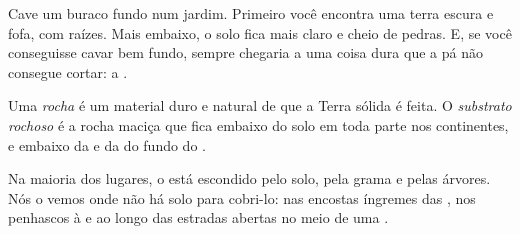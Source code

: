 Cave um buraco fundo num jardim. Primeiro você encontra uma terra escura e
fofa, com raízes. Mais embaixo, o solo fica mais claro e cheio de pedras.
E, se você conseguisse cavar bem fundo, sempre chegaria a uma coisa dura
que a pá não consegue cortar: a .

\begin{definition}\label{def:g3:stones-pebbles-sand:rock}
Uma \emph{rocha} é um material duro e natural de que a Terra
sólida é feita. O \emph{substrato rochoso} é a rocha
maciça que fica embaixo do solo em toda parte nos continentes, e embaixo
da  e da  do fundo do .
\end{definition}

Na maioria dos lugares, o  está escondido pelo solo, pela
grama e pelas árvores. Nós o vemos onde não há solo para cobri-lo: nas
encostas íngremes das , nos penhascos à  e ao longo das
estradas abertas no meio de uma .

